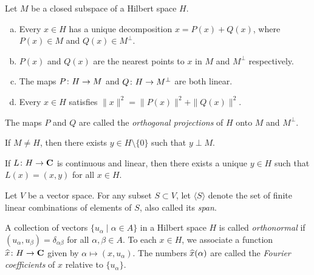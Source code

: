 \begin{theorem}
  Let $M$ be a closed subspace of a Hilbert space $H$.
  \begin{enumerate}[(a)]
  \item Every $x \in H$ has a unique decomposition $x = P(x) + Q(x)$, where $P(x) \in M$ and $Q(x) \in M^\perp$.
  \item $P(x)$ and $Q(x)$ are the nearest points to $x$ in $M$ and $M^\perp$ respectively.
  \item The maps $P \colon H \rightarrow M$ and $Q \colon H \rightarrow M^\perp$ are both linear.
  \item Every $x \in H$ satisfies $\|x\|^2 = \|P(x)\|^2 + \|Q(x)\|^2$.
  \end{enumerate}
  The maps $P$ and $Q$ are called the \emph{orthogonal projections} of $H$ onto $M$ and $M^\perp$.
\end{theorem}

\begin{corollary}
  If $M \neq H$, then there exists $y \in H \setminus \{0\}$ such that $y \perp M$.
\end{corollary}

\begin{theorem}
  If $L \colon H \rightarrow \mathbf{C}$ is continuous and linear, then there exists a unique $y \in H$ such that $L(x) = (x,y)$ for all $x \in H$.
\end{theorem}

\begin{definition}
  Let $V$ be a vector space. For any subset $S \subset V$, let $\langle S \rangle$ denote the set of finite linear combinations of elements of $S$, also called its \emph{span}.
\end{definition}

\begin{definition}
  A collection of vectors $\{ u_\alpha \;|\; \alpha \in A \}$ in a Hilbert space $H$ is called \emph{orthonormal} if $(u_\alpha,u_\beta) = \delta_{\alpha\beta}$ for all $\alpha,\beta \in A$. To each $x \in H$, we associate a function $\widehat{x} \colon H \rightarrow \mathbf{C}$ given by $\alpha \mapsto (x,u_\alpha)$. The numbers $\widehat{x}(\alpha)$ are called the \emph{Fourier coefficients} of $x$ relative to $\{u_\alpha\}$.
\end{definition}

